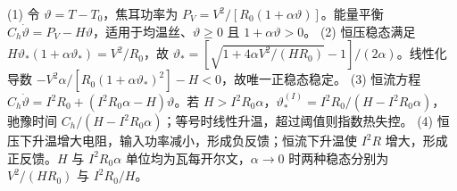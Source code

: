 (1) 令 \(\vartheta=T-T_0\)，焦耳功率为 \(P_V=V^2/[R_0(1+\alpha\vartheta)]\)。能量平衡 \(C_h\dot\vartheta=P_V-H\vartheta\)，适用于均温丝、\(\vartheta\ge0\) 且 \(1+\alpha\vartheta>0\)。
(2) 恒压稳态满足 \(H\vartheta_*(1+\alpha\vartheta_*)=V^2/R_0\)，故 \(\vartheta_*=[\sqrt{1+4\alpha V^2/(HR_0)}-1]/(2\alpha)\)。线性化导数 \(-V^2\alpha/[R_0(1+\alpha\vartheta_*)^2]-H<0\)，故唯一正稳态稳定。
(3) 恒流方程 \(C_h\dot\vartheta=I^2R_0+(I^2R_0\alpha-H)\vartheta\)。若 \(H>I^2R_0\alpha\)，\(\vartheta_*^{(I)}=I^2R_0/(H-I^2R_0\alpha)\)，驰豫时间 \(C_h/(H-I^2R_0\alpha)\)；等号时线性升温，超过阈值则指数热失控。
(4) 恒压下升温增大电阻，输入功率减小，形成负反馈；恒流下升温使 \(I^2R\) 增大，形成正反馈。\(H\) 与 \(I^2R_0\alpha\) 单位均为瓦每开尔文，\(\alpha\to0\) 时两种稳态分别为 \(V^2/(HR_0)\) 与 \(I^2R_0/H\)。
